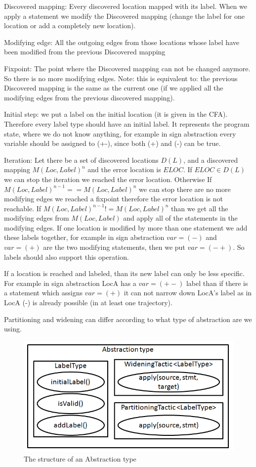 Discovered mapping:
Every discovered location mapped with its label. When we apply a statement we modify the Discovered mapping (change the label for one location or add a completely new location).

Modifying edge:
All the outgoing edges from those locations whose label have been modified from the previous Discovered mapping

Fixpoint:
The point where the Discovered mapping can not be changed anymore. So there is no more modifying edges. Note: this is equivalent to: the previous Discovered mapping is the same as the current one (if we applied all the modifying edges from the previous discovered mapping).

Initial step: we put a label on the initial location (it is given in the CFA). Therefore every label type should have an initial label. It represents the program state, where we do not know anything, for example in sign abstraction every variable should be assigned to (+-), since both (+) and (-) can be true.

Iteration:
Let there be a set of discovered locations $D(L)$, and a discovered mapping $M(Loc, Label)^{n}$ and the error location is $ELOC$.
If $ELOC \in D(L)$ we can stop the iteration we reached the error location.
Otherwise If $M(Loc, Label)^{n-1} == M(Loc, Label)^{n}$ we can stop there are no more modifying edges we reached a fixpoint therefore the error location is not reachable.
If $M(Loc, Label)^{n-1} != M(Loc, Label)^{n}$ than we get all the modifying edges from $M(Loc, Label)$ and apply all of the statements in the modifying edges.
If one location is modified by more than one statement we add these labels together, for example in sign abstraction $var=(-)$ and $var=(+)$ are the two modifying statements, then we put $var=(-+)$. So labels should also support this operation. 

If a location is reached and labeled, than its new label can only be less specific.
For example in sign abstraction LocA has a $var=(+-)$ label than if there is a statement which assigns $var=(+)$ it can not narrow down LocA's label as in LocA (-) is already possible (in at least one trajectory).

Partitioning and widening can differ according to what type of abstraction are we using.

\begin{figure} [!ht]
	\centering
	\includegraphics[width=150mm, keepaspectratio]{figures/abstractiontype.png}
	\caption{\label{fig:abstype} The structure of an Abstraction type}
\end{figure}








